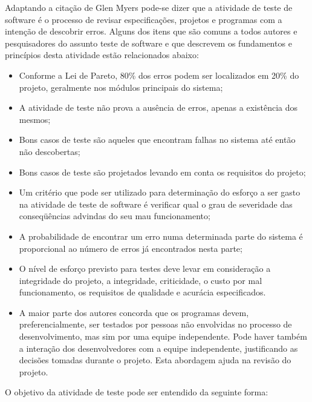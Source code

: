 Adaptando a citação de Glen Myers \cite{Myers:2004:AST:983238} pode-se dizer que a atividade de teste de software é o processo de revisar especificações, projetos e programas com a intenção de descobrir erros. Alguns dos itens que são comuns a todos autores e pesquisadores do assunto teste de software e que descrevem os fundamentos e princípios desta atividade estão relacionados abaixo:

\begin{itemize}
\item Conforme a Lei de Pareto, 80\% dos erros podem ser localizados em 20\% do projeto, geralmente nos módulos principais do sistema;

\item A atividade de teste não prova a ausência de erros, apenas a existência dos mesmos;
\item Bons casos de teste são aqueles que encontram falhas no sistema até então não descobertas;
\item Bons casos de teste são projetados levando em conta os requisitos do projeto;
\item Um critério que pode ser utilizado para determinação do esforço a ser gasto na atividade de teste de software é verificar qual o grau de severidade das conseqüências advindas do seu mau funcionamento;
\item A probabilidade de encontrar um erro numa determinada parte do sistema é proporcional ao número de erros já encontrados nesta parte;
\item O nível de esforço previsto para testes deve levar em consideração a integridade do projeto, a integridade, criticidade, o custo por mal funcionamento, os requisitos de qualidade e acurácia especificados.
\item A maior parte dos autores concorda que os programas devem, preferencialmente, ser testados por pessoas não envolvidas no processo de desenvolvimento, mas sim por uma equipe independente. Pode haver também a interação dos desenvolvedores com a equipe independente, justificando as decisões tomadas durante o projeto. Esta abordagem ajuda na revisão do projeto.

\end{itemize}

O objetivo da atividade de teste pode ser entendido da seguinte forma:

